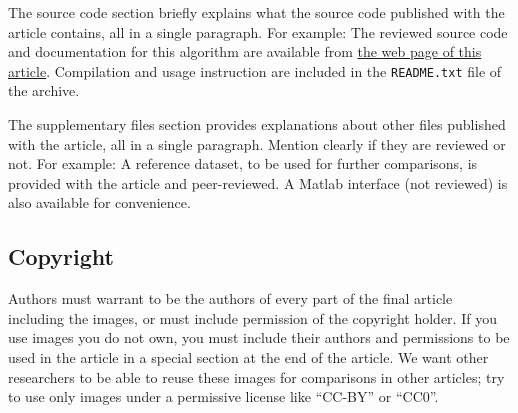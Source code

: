 \documentclass{ipol}
\begin{document}
\begin{ipolCode}
The source code section briefly explains what the source code
published with the article contains, all in a single paragraph. For
example: The reviewed source code and documentation for this algorithm
are available from \href{\ipolLink}{the web page of this
  article}. Compilation and usage instruction are included in the
\verb|README.txt| file of the archive.
\end{ipolCode}



\begin{ipolSupp}
The supplementary files section provides explanations about other
files published with the article, all in a single paragraph. Mention
clearly if they are reviewed or not. For example: A reference dataset,
to be used for further comparisons, is provided with the article and
peer-reviewed. A Matlab interface (not reviewed) is also available for
convenience.
\end{ipolSupp}








\subsection{Copyright}

Authors must warrant to be the authors of every part of the final
article including the images, or must include permission of the
copyright holder. If you use images you do not own, you must include
their authors and permissions to be used in the article in a special
section at the end of the article. We want other researchers to be
able to reuse these images for comparisons in other articles; try to
use only images under a permissive license like ``CC-BY'' or ``CC0''.
\end{document}
